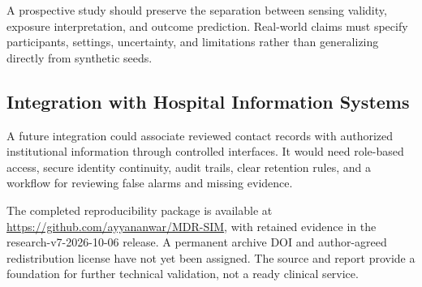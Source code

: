 \documentclass[12pt,a4paper]{report}
\begin{document}
A prospective study should preserve the separation between sensing validity, exposure interpretation, and outcome prediction. Real-world claims must specify participants, settings, uncertainty, and limitations rather than generalizing directly from synthetic seeds.

\subsection*{Integration with Hospital Information Systems}
A future integration could associate reviewed contact records with authorized institutional information through controlled interfaces. It would need role-based access, secure identity continuity, audit trails, clear retention rules, and a workflow for reviewing false alarms and missing evidence.

The completed reproducibility package is available at \url{https://github.com/ayyananwar/MDR-SIM}, with retained evidence in the research-v7-2026-10-06 release. A permanent archive DOI and author-agreed redistribution license have not yet been assigned. The source and report provide a foundation for further technical validation, not a ready clinical service.
\end{document}
